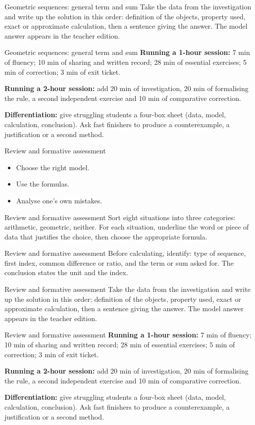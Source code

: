 \documentclass[aspectratio=169,10pt]{beamer}
\begin{document}
\begin{frame}{Geometric sequences: general term and sum}
Take the data from the investigation and write up the solution in this order: definition of the objects, property used, exact or approximate calculation, then a sentence giving the answer. The model answer appears in the teacher edition.
\end{frame}
\begin{frame}{Geometric sequences: general term and sum}
\textbf{Running a 1-hour session:} 7 min of fluency; 10 min of sharing and written record; 28 min of essential exercises; 5 min of correction; 3 min of exit ticket.

\textbf{Running a 2-hour session:} add 20 min of investigation, 20 min of formalising the rule, a second independent exercise and 10 min of comparative correction.

\textbf{Differentiation:} give struggling students a four-box sheet (data, model, calculation, conclusion). Ask fast finishers to produce a counterexample, a justification or a second method.
\end{frame}
\begin{frame}{Review and formative assessment}
\begin{itemize}
\item Choose the right model.
\item Use the formulas.
\item Analyse one's own mistakes.

\end{itemize}
\end{frame}
\begin{frame}{Review and formative assessment}
Sort eight situations into three categories: arithmetic, geometric, neither. For each situation, underline the word or piece of data that justifies the choice, then choose the appropriate formula.
\end{frame}
\begin{frame}{Review and formative assessment}
Before calculating, identify: type of sequence, first index, common difference or ratio, and the term or sum asked for. The conclusion states the unit and the index.
\end{frame}
\begin{frame}{Review and formative assessment}
Take the data from the investigation and write up the solution in this order: definition of the objects, property used, exact or approximate calculation, then a sentence giving the answer. The model answer appears in the teacher edition.
\end{frame}
\begin{frame}{Review and formative assessment}
\textbf{Running a 1-hour session:} 7 min of fluency; 10 min of sharing and written record; 28 min of essential exercises; 5 min of correction; 3 min of exit ticket.

\textbf{Running a 2-hour session:} add 20 min of investigation, 20 min of formalising the rule, a second independent exercise and 10 min of comparative correction.

\textbf{Differentiation:} give struggling students a four-box sheet (data, model, calculation, conclusion). Ask fast finishers to produce a counterexample, a justification or a second method.
\end{frame}
\end{document}
